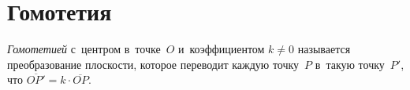 
\section*{Гомотетия}



\begingroup
    \def\ov{\overline}

\emph{Гомотетией} с~центром в~точке~$O$ и~коэффициентом $k \neq 0$ называется
преобразование плоскости, которое переводит каждую точку~$P$ в~такую
точку~$P'$, что $\ov{OP'} = k \cdot \ov{OP}$.

